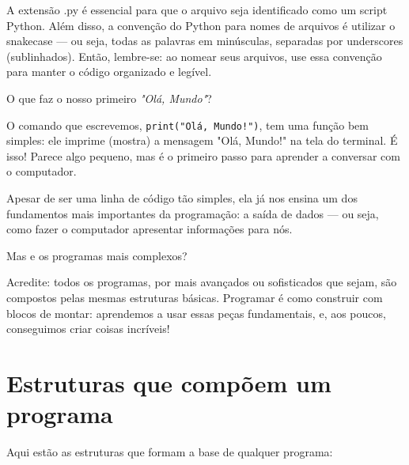 \documentclass[12pt]{book}
\begin{document}
	\begin{tcolorbox}[colback=gray!10, colframe=black, title={\large\bfseries Importante}]
	A extensão .py é essencial para que o arquivo seja identificado como um script Python. \newline Além disso, a convenção do Python para nomes de arquivos é utilizar o snakecase --- ou seja, todas as palavras em minúsculas, separadas por underscores (sublinhados). \newline
	Então, lembre-se: ao nomear seus arquivos, use essa convenção para manter o código organizado e legível.
	\end{tcolorbox}
	
	O que faz o nosso primeiro \textit{"Olá, Mundo"}?
	
	O comando que escrevemos, \texttt{print("Olá, Mundo!")}, tem uma função bem simples: ele imprime (mostra) a mensagem "Olá, Mundo!" na tela do terminal. É isso! Parece algo pequeno, mas é o primeiro passo para aprender a conversar com o computador.
	
	Apesar de ser uma linha de código tão simples, ela já nos ensina um dos fundamentos mais importantes da programação: a saída de dados — ou seja, como fazer o computador apresentar informações para nós.
	
	Mas e os programas mais complexos?
	
	Acredite: todos os programas, por mais avançados ou sofisticados que sejam, são compostos pelas mesmas estruturas básicas. Programar é como construir com blocos de montar: aprendemos a usar essas peças fundamentais, e, aos poucos, conseguimos criar coisas incríveis!
	
	\section{Estruturas que compõem um programa}
	
	Aqui estão as estruturas que formam a base de qualquer programa:
	
\end{document}
